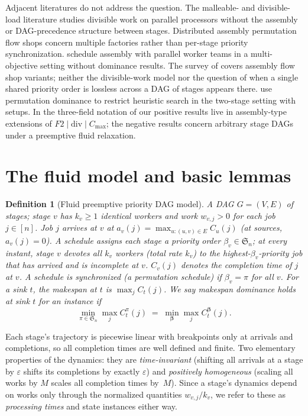 \documentclass[sn-mathphys,NameDate]{sn-jnl}
\theoremstyle{thmstyleone}
\theoremstyle{thmstylethree}
\newtheorem{definition}[theorem]{Definition}
\theoremstyle{thmstyletwo}
\begin{document}
Adjacent literatures do not address the question. The
malleable- and divisible-load literature
\citep{drozdowski2009} studies divisible work on parallel
processors without the assembly or DAG-precedence structure
between stages. Distributed assembly permutation flow shops
\citep{hatami2013} concern multiple factories rather than
per-stage priority synchronization. \citet{zhang2022} schedule
assembly with parallel worker teams in a multi-objective
setting without dominance results. The survey of
\citet{komaki2019} covers assembly flow shop variants; neither
the divisible-work model nor the question of when a single
shared priority order is lossless across a DAG of stages
appears there. \citet{alanzi2007} use permutation dominance to
restrict heuristic search in the two-stage setting with
setups. In the three-field notation of \citet{graham1979} our
positive results live in assembly-type extensions of
$F2 \mid \mathrm{div} \mid C_{\max}$; the negative results
concern arbitrary stage DAGs under a preemptive fluid relaxation.

\section{The fluid model and basic lemmas}
\label{sec:model}

\begin{definition}[Fluid preemptive priority DAG model]
\label{def:model}
A DAG $G = (V, E)$ of \emph{stages}; stage $v$ has $k_v \geq 1$
identical workers and work $w_{v,j} > 0$ for each job
$j \in [n]$. Job $j$ \emph{arrives} at $v$ at
$a_v(j) = \max_{u : (u,v) \in E} C_u(j)$ (at sources,
$a_v(j) = 0$). A schedule assigns each stage a priority order
$\beta_v \in \mathfrak{S}_n$; at every instant, stage $v$
devotes all $k_v$ workers (total rate $k_v$) to the
highest-$\beta_v$-priority job that has arrived and is
incomplete at $v$. $C_v(j)$ denotes the completion time of $j$
at $v$. A schedule is \emph{synchronized} (a permutation
schedule) if $\beta_v = \pi$ for all $v$. For a sink $t$, the
makespan at $t$ is $\max_j C_t(j)$. We say \emph{makespan
dominance holds at sink $t$} for an instance if
\[
  \min_{\pi \in \mathfrak{S}_n} \max_j C^{\pi}_t(j)
  \;=\;
  \min_{\boldsymbol{\beta}} \max_j C^{\boldsymbol\beta}_t(j).
\]
\end{definition}

Each stage's trajectory is piecewise linear with breakpoints
only at arrivals and completions, so all completion times are
well defined and finite. Two elementary properties of the
dynamics: they are \emph{time-invariant} (shifting all
arrivals at a stage by $\varepsilon$ shifts its completions by
exactly $\varepsilon$) and \emph{positively homogeneous}
(scaling all works by $M$ scales all completion times
by~$M$). Since a stage's dynamics depend on works only through
the normalized quantities $w_{v,j}/k_v$, we refer to these as
\emph{processing times} and state instances either way.
\end{document}
